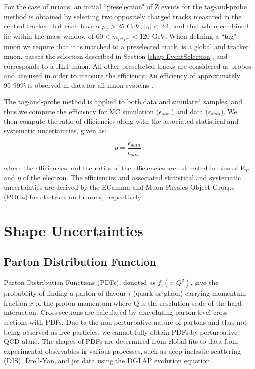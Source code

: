 For the case of muons, an initial ``preselection" of Z events for the tag-and-probe method is obtained by selecting two oppositely charged tracks measured in the central tracker that each have a $p_T > 25$ GeV, $|\eta| < 2.1$, and that when combined lie within the mass window of $60 < m_{\mu^+\mu^-} < 120$ GeV. When defining a ``tag" muon we require that it is matched to a preselected track, is a global and tracker muon, passes the selection described in Section \ref{chap-EventSelection}, and corresponds to a HLT muon. All other preselected tracks are considered as probes and are used in order to measure the efficiency. An efficiency of approximately 95-99\% is observed in data for all muon systems \cite{1748-0221-8-11-P11002}. 

The tag-and-probe method is applied to both data and simulated samples, and thus we compute the efficiency for MC simulation ($\epsilon_{sim.}$) and data ($\epsilon_{data}$).  We then compute the ratio of efficiencies along with the associated statistical and systematic uncertainties, given as:

\begin{equation}
\rho = \frac{\epsilon_{data}}{\epsilon_{sim.}}
\end{equation}

where the efficiencies and the ratios of the efficiencies are estimated in bins of E$_T$ and $\eta$ of the electron. The efficiencies and associated statistical and systematic uncertainties are derived by the EGamma and Muon Physics Object Groups (POGs) for electrons and muons, respectively.


\section{Shape Uncertainties} \label{sec-ShapeUncertainties}

\subsection{Parton Distribution Function} \label{subsec-PDFUncertainties}

Parton Distribution Functions (PDFs), denoted as $f_i(x, Q^2)$, give the probability of finding a parton of flavour $i$ (quark or gluon) carrying momentum fraction $x$ of the proton momentum where Q is the resolution scale of the hard interaction. Cross-sections are calculated by convoluting parton level cross-sections with PDFs. Due to the non-perturbative nature of partons and thus not being observed as free particles, we cannot fully obtain PDFs by perturbative QCD alone. The shapes of PDFs are determined from global fits to data from experimental observables in various processes, such as deep inelastic scattering (DIS), Drell-Yan, and jet data using the DGLAP evolution equation \cite{Vogt:2004mw}.

